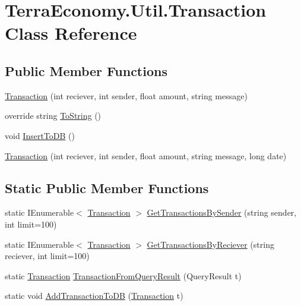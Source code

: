 \hypertarget{class_terra_economy_1_1_util_1_1_transaction}{}\section{Terra\+Economy.\+Util.\+Transaction Class Reference}
\label{class_terra_economy_1_1_util_1_1_transaction}
\subsection*{Public Member Functions}
\begin{DoxyCompactItemize}
\item 
\hyperlink{class_terra_economy_1_1_util_1_1_transaction_a644f5d52bf8420bdd5b1ca7f829a2321}{Transaction} (int reciever, int sender, float amount, string message)
\item 
override string \hyperlink{class_terra_economy_1_1_util_1_1_transaction_ad4a3a2770941b0b9fa80b51461931b19}{To\+String} ()
\item 
void \hyperlink{class_terra_economy_1_1_util_1_1_transaction_acfde7fb15e8eda41afeaf50175f60652}{Insert\+To\+DB} ()
\item 
\hyperlink{class_terra_economy_1_1_util_1_1_transaction_ad06814cbb48f3e5ecb8e050b1230e5b8}{Transaction} (int reciever, int sender, float amount, string message, long date)
\end{DoxyCompactItemize}
\subsection*{Static Public Member Functions}
\begin{DoxyCompactItemize}
\item 
static I\+Enumerable$<$ \hyperlink{class_terra_economy_1_1_util_1_1_transaction}{Transaction} $>$ \hyperlink{class_terra_economy_1_1_util_1_1_transaction_a865d6fa7341af2d7a30189303789d63a}{Get\+Transactions\+By\+Sender} (string sender, int limit=100)
\item 
static I\+Enumerable$<$ \hyperlink{class_terra_economy_1_1_util_1_1_transaction}{Transaction} $>$ \hyperlink{class_terra_economy_1_1_util_1_1_transaction_a7dc7d70c33aadae0598058415ea1a8bc}{Get\+Transactions\+By\+Reciever} (string reciever, int limit=100)
\item 
static \hyperlink{class_terra_economy_1_1_util_1_1_transaction}{Transaction} \hyperlink{class_terra_economy_1_1_util_1_1_transaction_a0341868856c8955ebfe3f811b2adf25b}{Transaction\+From\+Query\+Result} (Query\+Result t)
\item 
static void \hyperlink{class_terra_economy_1_1_util_1_1_transaction_a46638c443bc83ea6aef83d67d8af64d0}{Add\+Transaction\+To\+DB} (\hyperlink{class_terra_economy_1_1_util_1_1_transaction}{Transaction} t)
\end{DoxyCompactItemize}
